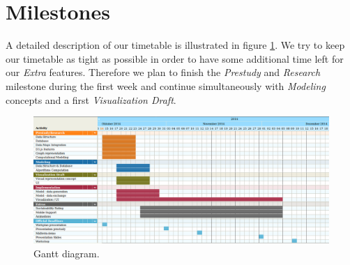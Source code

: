 \documentclass[a4page]{article}
\begin{document}
\section{Milestones}

A detailed description of our timetable is illustrated in figure \ref{fig:gant-diagram}. We try to keep our timetable as tight as possible in order to have some additional time left for our \textit{Extra} features. Therefore we plan to finish the \textit{Prestudy} and \textit{Research} milestone during the first week and continue simultaneously with \textit{Modeling} concepts and a first \textit{Visualization Draft}. 

\begin{figure}[ht]
 \centering
 \includegraphics[scale=0.7, angle=270]{gantt.png}
 \caption{Gantt diagram.}
 \label{fig:gant-diagram}
\end{figure}




\end{document}
